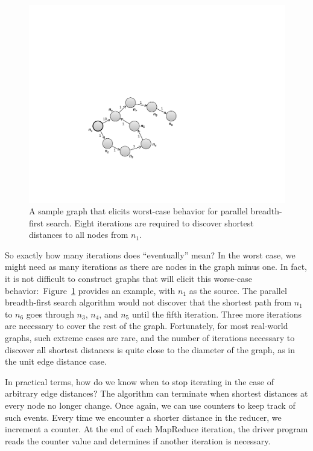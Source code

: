 \begin{figure}[t]
\begin{center}
\includegraphics[scale=0.6]{figures/fig-ch5-screwy-graph.pdf}
\end{center}
\caption{A sample graph that elicits worst-case behavior for parallel
  breadth-first search.  Eight iterations are required to discover
  shortest distances to all nodes from $n_1$.}
\label{figure:chapter-graphs:screwy-graph}
\end{figure}

So exactly how many iterations does ``eventually'' mean?  In the worst
case, we might need as many iterations as there are nodes in the graph
minus one.  In fact, it is not difficult to construct graphs that will
elicit this worse-case
behavior:\ Figure~\ref{figure:chapter-graphs:screwy-graph} provides an
example, with $n_1$ as the source.  The parallel breadth-first search
algorithm would not discover that the shortest path from $n_1$ to
$n_6$ goes through $n_3$, $n_4$, and $n_5$ until the fifth iteration.
Three more iterations are necessary to cover the rest of the graph.
Fortunately, for most real-world graphs, such extreme cases are rare,
and the number of iterations necessary to discover all shortest
distances is quite close to the diameter of the graph, as in the unit
edge distance case.

In practical terms, how do we know when to stop iterating in the case
of arbitrary edge distances?  The algorithm can terminate when
shortest distances at every node no longer change.  Once again, we can
use counters to keep track of such events.  Every time we encounter a
shorter distance in the reducer, we increment a counter.  At the end
of each MapReduce iteration, the driver program reads the counter
value and determines if another iteration is necessary.

